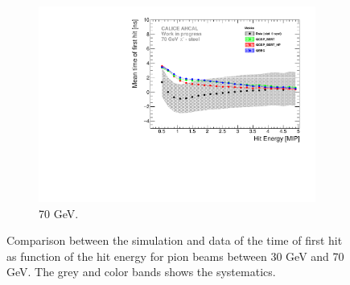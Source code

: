 \begin{figure}[htbp!]
  \hfill
  \begin{subfigure}[t]{0.5\textwidth}
    \centering
    \includegraphics[width=1\textwidth]{../Thesis_Plots/Timing/Pions/Plots/ComparisonToSim/Time_Energy_70GeV_Mokka.pdf}
    \caption{70 GeV.} \label{fig:Energy_SimData_70GeV}
  \end{subfigure}
  \caption{Comparison between the \mokka simulation and data of the time of first hit as function of the hit energy for pion beams between 30 GeV and 70 GeV. The grey and color bands shows the systematics.}
\end{figure}

